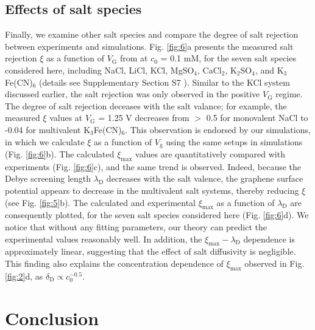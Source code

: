 \documentclass[journal=langd5,email=true, hyperref=true, keywords=false]{achemso}
\newcommand{\Fig}{Fig.}
\begin{document}
\subsection{Effects of salt species}
\label{sec:salts}

Finally, we examine other salt species and compare the degree of salt
rejection between experiments and simulations. \Fig{} \ref{fig:6}a
presents the measured salt rejection $\xi$ as a function of
$V_{\mathrm{G}}$ from at $c_{0}$ = 0.1 mM, for the seven salt species
considered here, including NaCl, LiCl, KCl, MgSO$_{4}$, CaCl$_{2}$,
K$_{2}$SO$_{4}$, and K$_{3}$Fe(CN)$_{6}$ (details see Supplementary
Section S7 ). Similar to the KCl system discussed earlier, the salt
rejection was only observed in the positive $V_{\mathrm{G}}$
regime. The degree of salt rejection deceases with the salt valance;
for example, the measured $\xi$ values at $V_{\mathrm{G}}$ = 1.25 V
decreases from $>$ 0.5 for monovalent NaCl to -0.04 for multivalent
K$_{3}$Fe(CN)$_{6}$. This observation is endorsed by our simulations,
in which we calculate $\xi$ as a function of $V_{\mathrm{g}}$ using
the same setups in simulations (\Fig{} \ref{fig:6}b). The calculated
$\xi_{\mathrm{max}}$ values are quantitatively compared with
experiments (\Fig{} \ref{fig:6}c), and the same trend is
observed. Indeed, because the Debye screening length
$\lambda_{\mathrm{D}}$ decreases with the salt valence, the graphene
surface potential appears to decrease in the multivalent salt systems,
thereby reducing $\xi$ (see \Fig{} \ref{fig:5}b). The calculated and
experimental $\xi_{\mathrm{max}}$ as a function of
$\lambda_{\mathrm{D}}$ are consequently plotted, for the seven salt
species considered here (\Fig{} \ref{fig:6}d). We notice that without
any fitting parameters, our theory can predict the experimental values
reasonably well. In addition, the
$\xi_{\mathrm{max}}-\lambda_{\mathrm{D}}$ dependence is approximately
linear, suggesting that the effect of salt diffusivity is
negligible. This finding also explains the concentration dependence of
$\xi_{\mathrm{max}}$ observed in \Fig{} \ref{fig:2}d, as
$\delta_{\mathrm{D}} \propto c_{0}^{-0.5}$.

\section{Conclusion}
\label{sec:consl}
\end{document}
